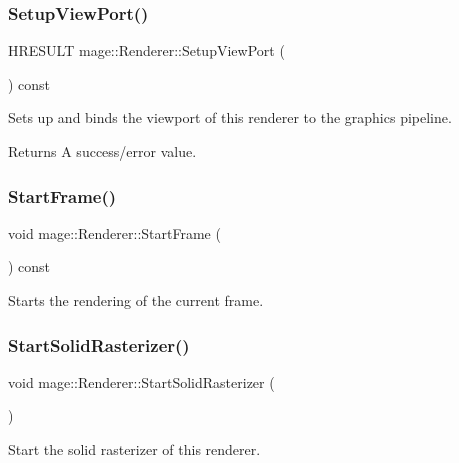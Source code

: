 \subsubsection{\texorpdfstring{Setup\+View\+Port()}{SetupViewPort()}}
{\footnotesize\ttfamily H\+R\+E\+S\+U\+LT mage\+::\+Renderer\+::\+Setup\+View\+Port (\begin{DoxyParamCaption}{ }\end{DoxyParamCaption}) const\hspace{0.3cm}{\ttfamily [private]}}

Sets up and binds the viewport of this renderer to the graphics pipeline.

\begin{DoxyReturn}{Returns}
A success/error value. 
\end{DoxyReturn}
\hypertarget{classmage_1_1_renderer_a5fea21434ad2ac5bcd9ca09cf5f41852}{}\label{classmage_1_1_renderer_a5fea21434ad2ac5bcd9ca09cf5f41852} 
\subsubsection{\texorpdfstring{Start\+Frame()}{StartFrame()}}
{\footnotesize\ttfamily void mage\+::\+Renderer\+::\+Start\+Frame (\begin{DoxyParamCaption}{ }\end{DoxyParamCaption}) const}

Starts the rendering of the current frame. \hypertarget{classmage_1_1_renderer_a921f7e037ce57927cef9512582e9e0fe}{}\label{classmage_1_1_renderer_a921f7e037ce57927cef9512582e9e0fe} 
\subsubsection{\texorpdfstring{Start\+Solid\+Rasterizer()}{StartSolidRasterizer()}}
{\footnotesize\ttfamily void mage\+::\+Renderer\+::\+Start\+Solid\+Rasterizer (\begin{DoxyParamCaption}{ }\end{DoxyParamCaption})}

Start the solid rasterizer of this renderer. \hypertarget{classmage_1_1_renderer_a479f89bf1770828ffcb2395a1f467ed4}{}\label{classmage_1_1_renderer_a479f89bf1770828ffcb2395a1f467ed4} 
